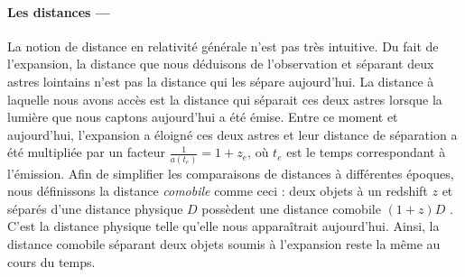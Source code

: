 \documentclass[11pt, twoside, a4paper, openright]{report}
\begin{document}
\paragraph{Les distances —}
La notion de distance en relativité générale n'est pas très intuitive.
Du fait de l'expansion, la distance que nous déduisons de l'observation et séparant deux astres lointains n'est pas la distance qui les sépare aujourd'hui. La distance à laquelle nous avons accès est la distance qui séparait ces deux astres lorsque la lumière que nous captons aujourd'hui a été émise. Entre ce moment et aujourd'hui, l'expansion a éloigné ces deux astres et leur distance de séparation a été multipliée par un facteur $\frac{1}{a(t_e)} = 1 + z_{e}$, où $t_e$ est le temps correspondant à l'émission.
Afin de simplifier les comparaisons de distances à différentes époques, nous définissons la distance \emph{comobile} comme ceci : deux objets à un redshift $z$ et séparés d'une distance physique $D$ possèdent une distance comobile $(1+z)D$ . C'est la distance physique telle qu'elle nous apparaîtrait aujourd'hui. Ainsi, la distance comobile séparant deux objets soumis à l'expansion reste la même au cours du temps.
\end{document}
